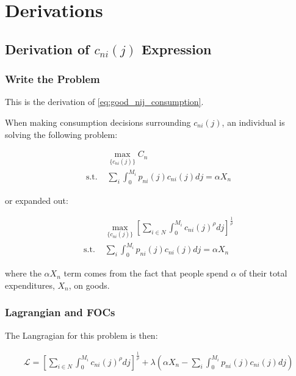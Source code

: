 \documentclass[10pt]{article}
\begin{document}
\section{Derivations}


\subsection{Derivation of $c_{n i}(j)$ Expression} 
\label{sec:good_nij_consumption}

\subsubsection{Write the Problem}
This is the derivation of \eqref{eq:good_nij_consumption}.

When making consumption decisions surrounding
$c_{n i}(j)$, an individual is solving the following problem:

\begin{align}
    &\underset{\{c_{n i}(j)\}}{\max} C_n \\ 
    \text{s.t. } &\sum_i \int_{0}^{M_i} p_{n i}(j) c_{n i}(j) d j=\alpha X_n
\end{align}

or expanded out:

\begin{align}
    &\underset{\{c_{n i}(j)\}}{\max} \left[\sum_{i \in N} \int_0^{M_i} c_{n i}(j)^\rho d j\right]^{\frac{1}{\rho}} \\
    \text{s.t. } &\sum_i \int_{0}^{M_i} p_{n i}(j) c_{n i}(j) d j=\alpha X_n
\end{align}

where the $\alpha X_n$ term comes from the fact that 
people spend $\alpha$ of their total expenditures, $X_n$,
on goods.

\subsubsection{Lagrangian and FOCs}

The Langragian for this problem is then:

\begin{align}
    \mathcal{L} = \left[\sum_{i \in N} \int_0^{M_i} c_{n i}(j)^\rho d j\right]^{\frac{1}{\rho}} + \lambda \left(\alpha X_n - \sum_i \int_{0}^{M_i} p_{n i}(j) c_{n i}(j) d j\right)
\end{align}
\end{document}
